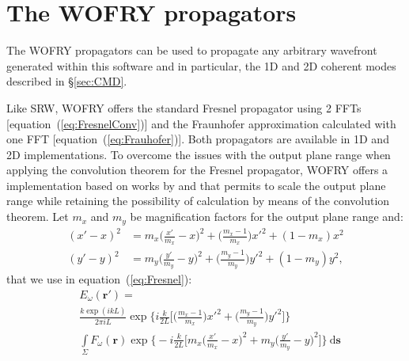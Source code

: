 \documentclass{iucr}              %
\begin{document}
\section{The WOFRY propagators}
\label{sec:appendixWOFRYpropagators}

The WOFRY propagators can be used to propagate any arbitrary wavefront generated within this software and in particular, the 1D and 2D coherent modes described in \S\ref{sec:CMD}. 

Like SRW, WOFRY offers the standard Fresnel propagator using 2 FFTs [equation~(\ref{eq:FresnelConv})] and the Fraunhofer approximation calculated with one FFT [equation~(\ref{eq:Frauhofer})]. Both propagators are available in 1D and 2D implementations. To overcome the issues with the output plane range when applying the convolution theorem for the Fresnel propagator, WOFRY offers a implementation based on works by  and  that permits to scale the output plane range while retaining the possibility of calculation by means of the convolution theorem. Let $m_x$ and $m_y$ be magnification factors for the output plane range and:
\begin{equation}
\begin{split}
  (x'-x)^2 &= m_x\bigg(\frac{x'}{m_x}-x\bigg)^2+\bigg(\frac{m_x-1}{m_x}\bigg)x'^2+(1-m_x)x^2\\
  (y'-y)^2 &= m_y\bigg(\frac{y'}{m_y}-y\bigg)^2+\bigg(\frac{m_y-1}{m_y}\bigg)y'^2+(1-m_y)y^2,
\end{split}
\end{equation}
that we use in equation~(\ref{eq:Fresnel}):
\begin{equation}\label{eq:ZoomFresnel}
\begin{split}
&E_\omega(\textbf{r}') =\\
&\frac{k\exp{(ikL)}}{2\pi i L}\exp{\bigg\{i\frac{k}{2L}\bigg[\bigg(\frac{m_x-1}{m_x}\bigg)x'^2 +\bigg(\frac{m_y-1}{m_y}\bigg)y'^2\bigg]\bigg\}}\\
&\int\limits_{\Sigma}{F_\omega(\textbf{r})\exp{\bigg\{-i \frac{k}{2 L}\bigg[m_x\bigg(\frac{x'}{m_x}-x\bigg)^2+ m_y\bigg(\frac{y'}{m_y}-y\bigg)^2\bigg]\bigg\}}~\mathrm{d}\textbf{s}
}
\end{split}
\end{equation}
\end{document}
